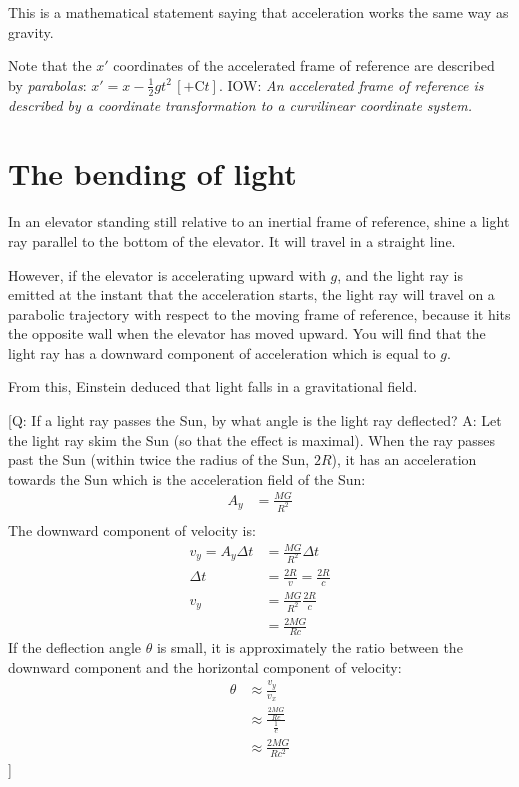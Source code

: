 \documentclass[pagesize,headsepline,10pt,parskip=half,BCOR=12mm]{scrreprt}
\begin{document}
      This is a mathematical statement saying
      that acceleration works the same way as gravity.

      Note that the $x'$ coordinates of the accelerated frame of
      reference are described by \emph{parabolas}: $x' = x -
      \frac{1}{2} gt^2\,[+ \mathrm{C}t]$. IOW: \emph{An accelerated
      frame of reference is described by a coordinate transformation to a
      curvilinear coordinate system.}

    \section{The bending of light}
      In an elevator standing still relative to an inertial frame
      of reference, shine a light ray parallel to the bottom of
      the elevator.  It will travel in a straight line.

      However, if the elevator is accelerating upward with $g$, and
      the light ray is emitted at the instant that the
      acceleration starts, the light ray will travel on a parabolic
      trajectory with respect to the moving frame of reference,
      because it hits the opposite wall when the elevator has moved
      upward.  You will find that the light ray has a downward
      component of acceleration which is equal to $g$.

      From this, Einstein deduced that light falls in a
      gravitational field.

      [Q: If a light ray passes the Sun, by what angle is the light
      ray deflected?
      A: Let the light ray skim the Sun (so that the effect is
      maximal).  When the ray passes past the Sun (within twice the
      radius of the Sun, $2R$), it has an acceleration towards the
      Sun which is the acceleration field of the Sun:
      \begin{align*}
        A_y &= \frac{MG}{R^2} \\
      \end{align*}
      The downward component of velocity is:
      \begin{align*}
        v_y = A_y \Delta t &= \frac{MG}{R^2} \Delta t\\
        \Delta t &= \frac{2R}{v} = \frac{2R}{c} \\
        v_y &= \frac{MG}{R^2} \frac{2R}{c}\\
            &= \frac{2MG}{Rc}
      \end{align*}
      If the deflection angle $\theta$ is small, it is
      approximately the ratio between the downward component and
      the horizontal component of velocity:
      \begin{align*}
        \theta &\approx \frac{v_y}{v_x} \\
        &\approx \frac{\frac{2MG}{Rc}}{\frac{1}{c}} \\
        &\approx \frac{2MG}{Rc^2}
      \end{align*}]
\end{document}
